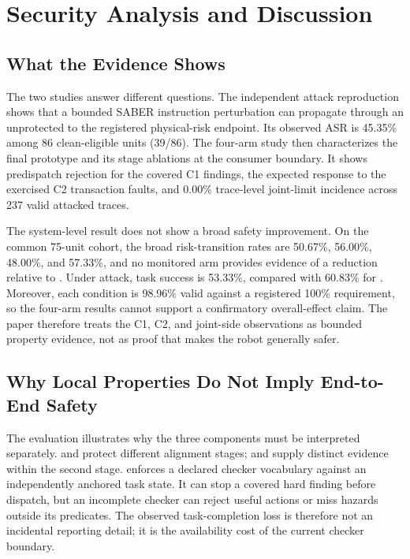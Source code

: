 \section{Security Analysis and Discussion}
\label{sec:discussion}

\subsection{What the Evidence Shows}

The two studies answer different questions.  The independent attack
reproduction shows that a bounded SABER instruction perturbation can propagate
through an unprotected \vla to the registered physical-risk endpoint.  Its
observed ASR is 45.35\% among 86 clean-eligible units (39/86).  The four-arm
study then characterizes the final \system prototype and its stage ablations at
the consumer boundary.  It shows predispatch rejection for the covered C1 findings, the
expected response to the exercised C2 transaction faults, and 0.00\%
trace-level joint-limit incidence across 237 valid attacked \ltwoenabled traces.

The system-level result does not show a broad safety improvement.  On the common
75-unit cohort, the broad risk-transition rates are 50.67\%, 56.00\%, 48.00\%,
and 57.33\%, and no monitored arm provides evidence of a reduction relative to
\vlaonly.  Under attack, \dual task success is 53.33\%, compared with 60.83\%
for \vlaonly.  Moreover, each condition is 98.96\% valid against a registered
100\% requirement, so the four-arm results cannot support a confirmatory
overall-effect claim.  The
paper therefore treats the C1, C2, and joint-side observations as bounded
property evidence, not as proof that \system makes the robot generally safer.

\subsection{Why Local Properties Do Not Imply End-to-End Safety}

The evaluation illustrates why the three components must be interpreted
separately.  \lone and \ltwo protect different alignment stages; \ltwoa and
\ltwob supply distinct evidence within the second stage.  \taskassessment
enforces a declared checker vocabulary against an
independently anchored task state.  It can stop a covered hard finding before
dispatch, but an incomplete checker can reject useful actions or miss hazards
outside its predicates.  The observed task-completion loss is therefore not an
incidental reporting detail; it is the availability cost of the current checker
boundary.


